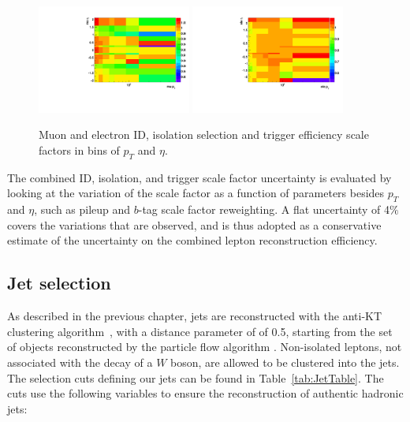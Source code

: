 \begin{figure}[hbtp]
 \begin{center}
   \includegraphics[width=0.45\textwidth]{Figures/Analysis_1_Diagrams/2d_mu_pt_eta_full_id_iso_hlt_data_over_mc.pdf}
   \includegraphics[width=0.45\textwidth]{Figures/Analysis_1_Diagrams/2d_ele_pt_eta_full_id_iso_hlt_data_over_mc.pdf}
   \caption{Muon and electron ID, isolation selection and trigger efficiency scale factors in bins of $p_{T}$ and $\eta$.}
   \label{fig:effSFHLT}
 \end{center}
\end{figure}

\par The combined ID, isolation, and trigger scale factor
uncertainty is evaluated by looking at the variation of the scale
factor as a function of parameters besides $p_T$ and $\eta$, such as
pileup and $b$-tag scale factor reweighting.  A flat uncertainty of 4$\%$
covers the variations that are observed, and is thus adopted as a
conservative estimate of the uncertainty on the combined lepton
reconstruction efficiency.  

\subsection{Jet selection}
\label{jet_selection_overview}

\par As described in the previous chapter, jets are reconstructed with
the anti-KT clustering algorithm~\cite{Cacciari:2008gp}, with a
distance parameter of of 0.5, starting from the set of objects
reconstructed by the particle flow algorithm
\cite{CMS-PAS-PFT-09-001}. Non-isolated leptons, not associated
with the decay of a $W$ boson, are allowed to be clustered into the
jets.  The selection cuts defining our jets can 
be found in Table~\ref{tab:JetTable}.  The cuts use the following
variables to ensure the reconstruction of authentic hadronic jets:

